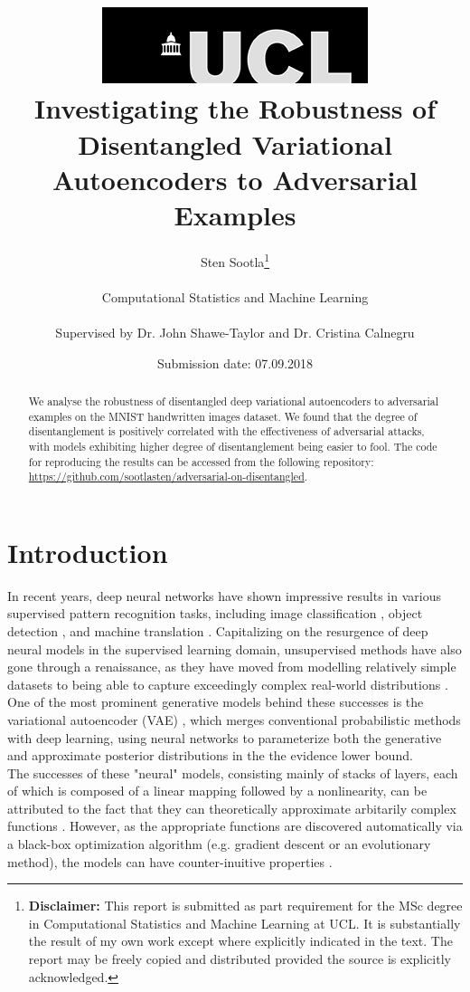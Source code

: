 \documentclass{report}
\title{{ \includegraphics[scale=.5,natwidth=294,natheight=84]{ucl_logo}}\\
{{\Huge Investigating the Robustness of Disentangled Variational Autoencoders to Adversarial Examples}}\\}
\date{Submission date: 07.09.2018}
\author{Sten Sootla\thanks{
{\bf Disclaimer:}
This report is submitted as part requirement for the MSc degree in Computational Statistics and Machine Learning at UCL. It is substantially the result of my own work except where explicitly indicated in the text. The report may be freely copied and distributed provided the source is explicitly acknowledged.}
\\ \\
Computational Statistics and Machine Learning\\ \\
Supervised by Dr. John Shawe-Taylor and Dr. Cristina Calnegru
}
\begin{document}
 
\onehalfspacing
\maketitle
\begin{abstract}
We analyse the robustness of disentangled deep variational autoencoders to adversarial examples on the MNIST handwritten images dataset. We found that the degree of disentanglement is positively correlated with the effectiveness of adversarial attacks, with models exhibiting higher degree of disentanglement being easier to fool. The code for reproducing the results can be accessed from the following repository: \url{https://github.com/sootlasten/adversarial-on-disentangled}. \\


\end{abstract}
\tableofcontents
\setcounter{page}{1}

\chapter{Introduction}

\noindent In recent years, deep neural networks have shown impressive results in various supervised pattern recognition tasks, including image classification \cite{alexnet, resnet}, object detection \cite{rcnn}, and machine translation \cite{nmt}. Capitalizing on the resurgence of deep neural models in the supervised learning domain, unsupervised methods have also gone through a renaissance, as they have moved from modelling relatively simple datasets \cite{rbm, helmholtz} to being able to capture exceedingly complex real-world distributions \cite{began, musicvae}. One of the most prominent generative models behind these successes is the variational autoencoder (VAE) \cite{vae}, which merges conventional probabilistic methods with deep learning, using neural networks to parameterize both the generative and approximate posterior distributions in the the evidence lower bound. \\

\noindent The successes of these "neural" models, consisting mainly of stacks of layers, each of which is composed of a linear mapping followed by a nonlinearity, can be attributed to the fact that they can theoretically approximate arbitarily complex functions \cite{Cybenko1989}. However, as the appropriate functions are discovered automatically via a black-box optimization algorithm (e.g. gradient descent or an evolutionary method), the models can have counter-inuitive properties \cite{intriguing-properties}. \\
\end{document}
